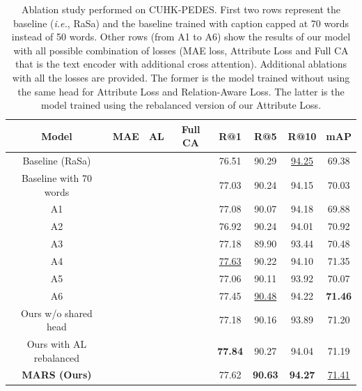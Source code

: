 \documentclass[acmsmall]{acmart}
\newcommand{\vcheck}[0]{\textcolor{green}{\ding{51}}}
\newcommand{\xmark}[0]{\textcolor{red}{\ding{55}}}
\begin{document}
\begin{table}[t!]
    \centering


    \begin{tabular}{c|ccc|cccc}
    \hline
    Model & MAE & AL & Full CA & R@1 & R@5 & R@10 & mAP \\
    \hline
    Baseline (RaSa) & \xmark{} & \xmark{} & \xmark{} & 76.51 & 90.29 & \underline{94.25} & 69.38 \\
    Baseline with 70 words & \xmark{} & \xmark{} & \xmark{} & 77.03 & 90.24 & 94.15 & 70.03 \\
    \hline 
    A1 & \vcheck{} & \xmark{}  & \xmark{}  & 77.08 & 90.07 & 94.18 & 69.88 \\
    A2 & \xmark{}  & \vcheck{} & \xmark{}  & 76.92 & 90.24 & 94.01 & 70.92\\
    A3 & \xmark{}  & \xmark{}  & \vcheck{} & 77.18 & 89.90 & 93.44 & 70.48 \\
    A4 & \vcheck{} & \vcheck{} & \xmark{}  & \underline{77.63} & 90.22 & 94.10 & 71.35\\
    A5 & \vcheck{} & \xmark{}  & \vcheck{} & 77.06 & 90.11 & 93.92 & 70.07 \\
    A6 & \xmark{}  & \vcheck{} & \vcheck{} & 77.45 & \underline{90.48} & 94.22 & \textbf{71.46} \\
    \hline
    Ours w/o shared head     & \vcheck{} & \vcheck{} & \vcheck{} &  77.18 & 90.16 & 93.89 & 71.20 \\
    Ours with AL rebalanced & \vcheck{} & \vcheck{} & \vcheck{} & \textbf{77.84} & 90.27 & 94.04 & 71.19 \\
    \hline
    \textbf{MARS (Ours)}     & \vcheck{} & \vcheck{} & \vcheck{} &  77.62 & \textbf{90.63} & \textbf{94.27} & \underline{71.41} \\
    \end{tabular}

    \caption{Ablation study performed on CUHK-PEDES. First two rows represent the baseline (\textit{i.e.}, RaSa) and the baseline trained with caption capped at 70 words instead of 50 words. Other rows (from A1 to A6) show the results of our model with all possible combination of losses (MAE loss, Attribute Loss and Full CA that is the text encoder with additional cross attention). Additional ablations with all the losses are provided. The former is the model trained without using the same head for Attribute Loss and Relation-Aware Loss. The latter is the model trained using the rebalanced version of our Attribute Loss.}
    \label{tab:ablation}

\end{table}
\end{document}
